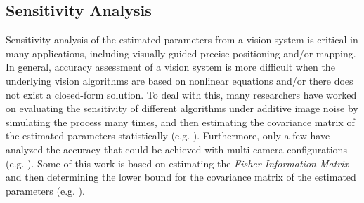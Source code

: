 

\subsection{Sensitivity Analysis}
Sensitivity analysis of the estimated parameters from a vision system is critical in many
applications, including visually guided precise positioning and/or mapping. In general, accuracy
assessment of a vision system is more difficult when the underlying vision algorithms are based on
nonlinear equations and/or there does not exist a closed-form solution. To deal with this, many
researchers have worked on evaluating the sensitivity of different algorithms under additive image
noise by simulating the process many times, and then estimating the covariance matrix of the
estimated parameters statistically (e.g. \cite{cro98,fir03-1,ple03}). Furthermore, only a few have
analyzed the accuracy that could be achieved with multi-camera configurations (e.g.
\cite{fer00,har94,ple03}). Some of this work is based on estimating the \emph{Fisher Information
Matrix} \cite{sor80} and then determining the lower bound for the covariance matrix of the
estimated parameters (e.g. \cite{ple03}).

